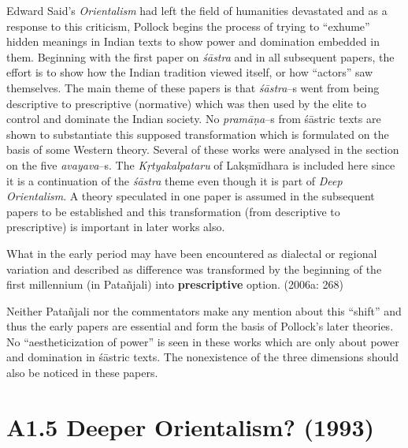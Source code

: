 Edward Said’s \textit{Orientalism} had left the field of humanities devastated and as a response to this criticism, Pollock begins the process of trying to “exhume” hidden meanings in Indian texts to show power and domination embedded in them. Beginning with the first paper on \textit{śāstra} and in all subsequent papers, the effort is to show how the Indian tradition viewed itself, or how “actors” saw themselves. The main theme of these papers is that \textit{śāstra}–s went from being descriptive to prescriptive (normative) which was then used by the elite to control and dominate the Indian society. No \textit{pramāṇa}–s from śāstric texts are shown to substantiate this supposed transformation which is formulated on the basis of some Western theory. Several of these works were analysed in the section on the five \textit{avayava}–s\break [4.6]. The \textit{Kṛtyakalpataru} of Lakṣmīdhara is included here since it is a continuation of the \textit{śāstra} theme even though it is part of \textit{Deep Orientalism}. A theory speculated in one paper is assumed in the subsequent papers to be established and this transformation (from descriptive to prescriptive) is important in later works also.

\begin{myquote}
What in the early period may have been encountered as dialectal or regional variation and described as difference was transformed by the beginning of the ﬁrst millennium (in Patañjali) into \textbf{prescriptive} option. (2006a: 268)
\end{myquote}

Neither Patañjali nor the commentators make any mention about this “shift” and thus the early papers are essential and form the basis of Pollock’s later theories. No “aestheticization of power” is seen in these works which are only about power and domination in śāstric texts. The nonexistence of the three dimensions should also be noticed in these papers.

\vspace{-.6cm}

\section*{A1.5 Deeper Orientalism? (1993)}

\vspace{-.2cm}

